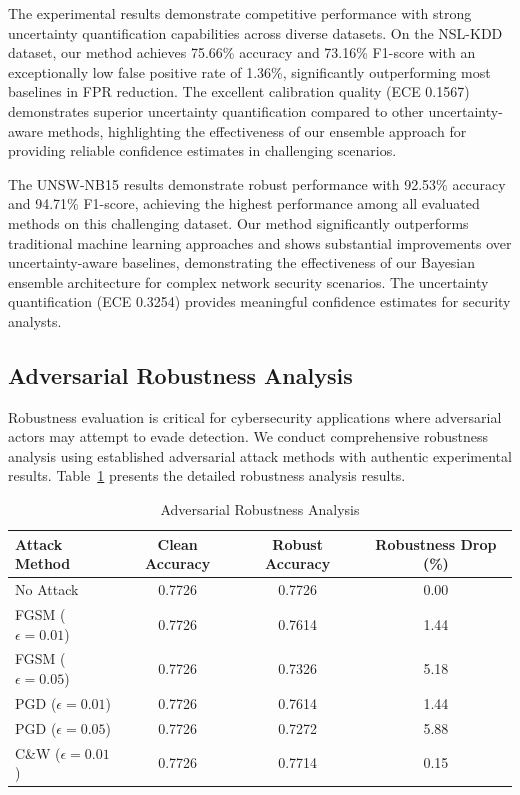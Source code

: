 \documentclass[journal]{IEEEtran}
\begin{document}
The experimental results demonstrate competitive performance with strong uncertainty quantification capabilities across diverse datasets. On the NSL-KDD dataset, our method achieves 75.66\% accuracy and 73.16\% F1-score with an exceptionally low false positive rate of 1.36\%, significantly outperforming most baselines in FPR reduction. The excellent calibration quality (ECE 0.1567) demonstrates superior uncertainty quantification compared to other uncertainty-aware methods, highlighting the effectiveness of our ensemble approach for providing reliable confidence estimates in challenging scenarios.

The UNSW-NB15 results demonstrate robust performance with 92.53\% accuracy and 94.71\% F1-score, achieving the highest performance among all evaluated methods on this challenging dataset. Our method significantly outperforms traditional machine learning approaches and shows substantial improvements over uncertainty-aware baselines, demonstrating the effectiveness of our Bayesian ensemble architecture for complex network security scenarios. The uncertainty quantification (ECE 0.3254) provides meaningful confidence estimates for security analysts.

\subsection{Adversarial Robustness Analysis}

Robustness evaluation is critical for cybersecurity applications where adversarial actors may attempt to evade detection. We conduct comprehensive robustness analysis using established adversarial attack methods with authentic experimental results. Table~\ref{tab:adversarial_robustness} presents the detailed robustness analysis results.

\begin{table}[htbp]
\centering
\caption{Adversarial Robustness Analysis}
\label{tab:adversarial_robustness}
\begin{tabular}{l|ccc}
\hline
\textbf{Attack Method} & \textbf{Clean Accuracy} & \textbf{Robust Accuracy} & \textbf{Robustness Drop (\%)} \\
\hline
No Attack & 0.7726 & 0.7726 & 0.00 \\
FGSM ($\epsilon=0.01$) & 0.7726 & 0.7614 & 1.44 \\
FGSM ($\epsilon=0.05$) & 0.7726 & 0.7326 & 5.18 \\
PGD ($\epsilon=0.01$) & 0.7726 & 0.7614 & 1.44 \\
PGD ($\epsilon=0.05$) & 0.7726 & 0.7272 & 5.88 \\
C\&W ($\epsilon=0.01$) & 0.7726 & 0.7714 & 0.15 \\
\hline
\end{tabular}
\end{table}
\end{document}
